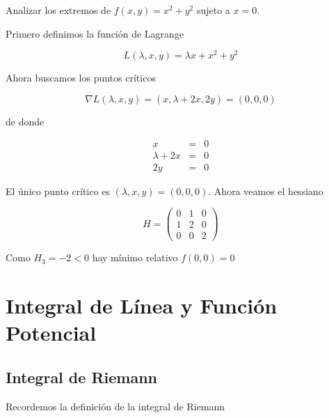 \begin{example}
Analizar los extremos de $f(x,y) = x^2 + y^2$ sujeto a $x=0$.

Primero definimos la función de Lagrange

$$ L(\lambda, x,y) = \lambda x + x^2 + y^2$$

Ahora buscamos los puntos críticos

$$ \nabla L(\lambda, x,y) = (x, \lambda+2x, 2y) = (0,0,0)$$

de donde

\begin{eqnarray*} x &=& 0 \\
\lambda + 2x &=& 0 \\
2y &=& 0 \end{eqnarray*}

El único punto crítico es $ (\lambda, x,y) = (0,0,0)$.  Ahora veamos el hessiano

$$ H = \begin{pmatrix} 0 & 1 & 0 \\ 1 & 2 & 0 \\ 0 & 0 & 2 \end{pmatrix} $$

Como $ H_3 = -2 < 0$ hay mínimo relativo $ f(0,0) = 0$
\end{example}



\chapter{Integral de Línea y Función Potencial}

\section{Integral de Riemann}

Recordemos la definición de la integral de Riemann

